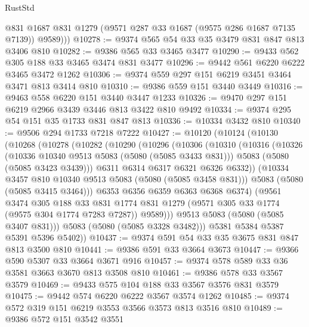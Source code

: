 \begin{lexlean}{RustStd}
\begin{coremodule}
          @831
          @1687
          @831
          @1279
          (@9571 @287 @33 @1687 (@9575 @286 @1687 @7135 @7139))
          @9589)))
@10278 := @9374 @565 @54 @33 @35 @3479 @831 @847 @813 @3406 @810
@10282 := @9386 @565 @33 @3465 @3477
@10290 := @9433 @562 @305 @188 @33 @3465 @3474 @831 @3477
@10296 := @9442 @561 @6220 @6222 @3465 @3472 @1262
@10306 := @9374 @559 @297 @151 @6219 @3451 @3464 @3471 @813 @3414 @810
@10310 := @9386 @559 @151 @3440 @3449
@10316 := @9463 @558 @6220 @151 @3440 @3447 @1233
@10326 := @9470 @297 @151 @6219 @2966 @3439 @3446 @813 @3422 @810 @9492
@10334 := @9374 @295 @54 @151 @35 @1733 @831 @847 @813
@10336 := @10334 @3432 @810
@10340 := @9506 @294 @1733 @7218 @7222
@10427 := @10120
    (@10124
      (@10130
        (@10268
          (@10278
            (@10282
              (@10290
                (@10296
                  (@10306
                    (@10310
                      (@10316
                        (@10326
                          (@10336 @10340 @9513 @5083 (@5080 (@5085 @3433 @831)))
                          @5083
                          (@5080 (@5085 @3423 @3439)))
                        @6311
                        @6314
                        @6317
                        @6321
                        @6326
                        @6332))
                    (@10334 @3457 @810 @10340 @9513 @5083 (@5080 (@5085 @3458 @831)))
                    @5083
                    (@5080 (@5085 @3415 @3464)))
                  @6353
                  @6356
                  @6359
                  @6363
                  @6368
                  @6374)
                (@9561
                  @3474
                  @305
                  @188
                  @33
                  @831
                  @1774
                  @831
                  @1279
                  (@9571 @305 @33 @1774 (@9575 @304 @1774 @7283 @7287))
                  @9589)))
            @9513
            @5083
            (@5080 (@5085 @3407 @831)))
          @5083
          (@5080 (@5085 @3328 @3482)))
        @5381
        @5384
        @5387
        @5391
        @5396
        @5402))
@10437 := @9374 @591 @54 @33 @35 @3675 @831 @847 @813 @3500 @810
@10441 := @9386 @591 @33 @3664 @3673
@10447 := @9366 @590 @5307 @33 @3664 @3671 @916
@10457 := @9374 @578 @589 @33 @36 @3581 @3663 @3670 @813 @3508 @810
@10461 := @9386 @578 @33 @3567 @3579
@10469 := @9433 @575 @104 @188 @33 @3567 @3576 @831 @3579
@10475 := @9442 @574 @6220 @6222 @3567 @3574 @1262
@10485 := @9374 @572 @319 @151 @6219 @3553 @3566 @3573 @813 @3516 @810
@10489 := @9386 @572 @151 @3542 @3551

\end{coremodule}
\end{lexlean}
